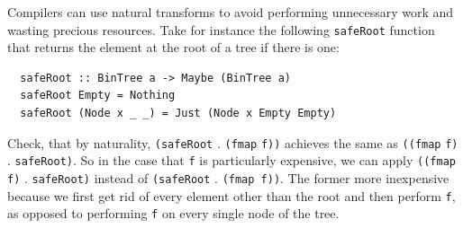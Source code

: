 \begin{remark} Compilers can use natural transforms to avoid performing unnecessary work and wasting precious resources. Take for instance the following \texttt{safeRoot} function that returns the element at the root of a tree if there is one:
  \begin{verbatim}
  safeRoot :: BinTree a -> Maybe (BinTree a)
  safeRoot Empty = Nothing
  safeRoot (Node x _ _) = Just (Node x Empty Empty)
\end{verbatim}
Check, that by naturality, \texttt{(safeRoot} $ . $ \texttt{(fmap} \texttt{f))} achieves the same as \texttt{((fmap} \texttt{f)} $ . $ \texttt{safeRoot)}. So in the case that \texttt{f} is particularly expensive, we can apply \texttt{((fmap f)} $.$ \texttt{safeRoot)} instead of \texttt{(safeRoot} $.$ \texttt{(fmap f))}. The former more inexpensive because we first get rid of every element other than the root and then perform \texttt{f}, as opposed to performing \texttt{f} on every single node of the tree.
\end{remark}

